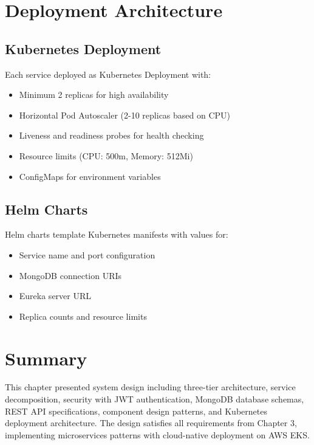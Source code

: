 \section{Deployment Architecture}

\subsection{Kubernetes Deployment}

Each service deployed as Kubernetes Deployment with:
\begin{itemize}
    \item Minimum 2 replicas for high availability
    \item Horizontal Pod Autoscaler (2-10 replicas based on CPU)
    \item Liveness and readiness probes for health checking
    \item Resource limits (CPU: 500m, Memory: 512Mi)
    \item ConfigMaps for environment variables
\end{itemize}

\subsection{Helm Charts}

Helm charts template Kubernetes manifests with values for:
\begin{itemize}
    \item Service name and port configuration
    \item MongoDB connection URIs
    \item Eureka server URL
    \item Replica counts and resource limits
\end{itemize}

\section{Summary}

This chapter presented system design including three-tier architecture, service decomposition, security with JWT authentication, MongoDB database schemas, REST API specifications, component design patterns, and Kubernetes deployment architecture. The design satisfies all requirements from Chapter 3, implementing microservices patterns with cloud-native deployment on AWS EKS.
